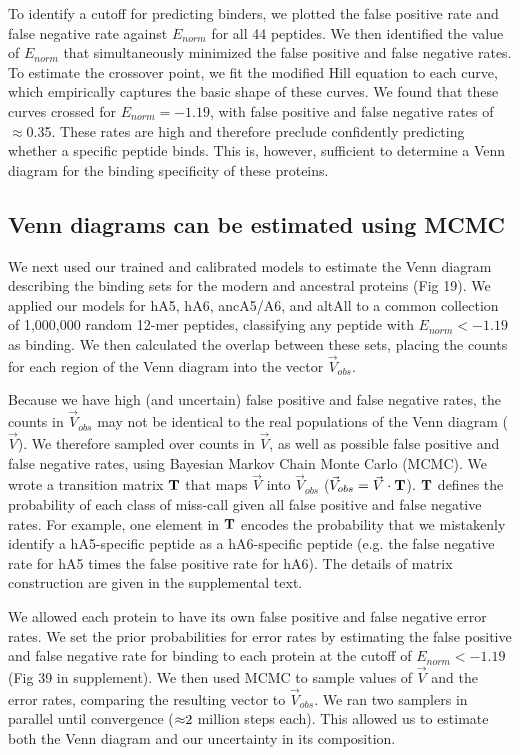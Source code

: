 To identify a cutoff for predicting binders, we plotted the false
positive rate and false negative rate against $E_{norm}$ for all
44 peptides. We then identified the value of $E_{norm}$ that simultaneously
minimized the false positive and false negative rates. To estimate
the crossover point, we fit the modified Hill equation to each curve,
which empirically captures the basic shape of these curves. We found
that these curves crossed for $E_{norm}=-1.19$, with false positive
and false negative rates of $\approx$0.35. These rates are high and
therefore preclude confidently predicting whether a specific peptide
binds. This is, however, sufficient to determine a Venn diagram for
the binding specificity of these proteins. 

\subsection{Venn diagrams can be estimated using MCMC}

We next used our trained and calibrated models to estimate the Venn
diagram describing the binding sets for the modern and ancestral proteins
(Fig 19). We applied our models for hA5, hA6, ancA5/A6, and altAll
to a common collection of 1,000,000 random 12-mer peptides, classifying
any peptide with $E_{norm}<-1.19$ as binding. We then calculated
the overlap between these sets, placing the counts for each region
of the Venn diagram into the vector $\vec{V}_{obs}$. 

Because we have high (and uncertain) false positive and false negative
rates, the counts in $\vec{V}_{obs}$ may not be identical to the
real populations of the Venn diagram ($\vec{V}$). We therefore sampled
over counts in $\vec{V}$, as well as possible false positive and
false negative rates, using Bayesian Markov Chain Monte Carlo (MCMC).
We wrote a transition matrix ${\bf T}$ that maps $\vec{V}$ into
$\vec{V}_{obs}$ ($\vec{V}_{obs}=\vec{V}\cdot{\bf T}$). ${\bf T}$
defines the probability of each class of miss-call given all false
positive and false negative rates. For example, one element in ${\bf T}$
encodes the probability that we mistakenly identify a hA5-specific
peptide as a hA6-specific peptide (e.g. the false negative rate for
hA5 times the false positive rate for hA6). The details of matrix
construction are given in the supplemental text. 

We allowed each protein to have its own false positive and false negative
error rates. We set the prior probabilities for error rates by estimating
the false positive and false negative rate for binding to each protein
at the cutoff of $E_{norm}<-1.19$ (Fig 39 in supplement). We
then used MCMC to sample values of $\vec{V}$ and the error rates,
comparing the resulting vector to $\vec{V}_{obs}$. We ran two samplers
in parallel until convergence ($\text{\ensuremath{\approx}}2$ million
steps each). This allowed us to estimate both the Venn diagram and
our uncertainty in its composition. 

